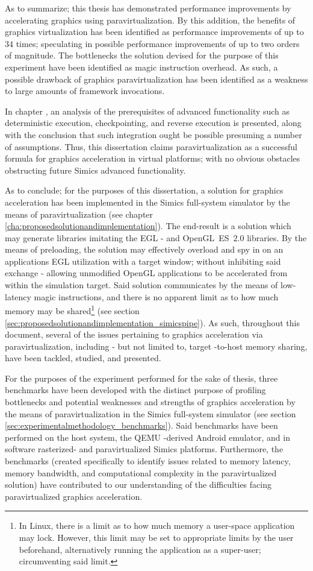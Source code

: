 As to summarize; this thesis has demonstrated performance improvements by accelerating graphics using paravirtualization.
By this addition, the benefits of graphics virtualization has been identified as performance improvements of up to $34$ times; speculating in possible performance improvements of up to two orders of magnitude.
The bottlenecks the solution devised for the purpose of this experiment have been identified as magic instruction overhead.
As such, a possible drawback of graphics paravirtualization has been identified as a weakness to large amounts of framework invocations.

In chapter , an analysis of the prerequisites of advanced functionality such as deterministic execution, checkpointing, and reverse execution is presented, along with the conclusion that such integration ought be possible presuming a number of assumptions.
Thus, this dissertation claims paravirtualization as a successful formula for graphics acceleration in virtual platforms; with no obvious obstacles obstructing future Simics advanced functionality.

As to conclude; for the purposes of this dissertation, a solution for graphics acceleration has been implemented in the Simics full-system simulator by the means of paravirtualization (see chapter \ref{cha:proposedsolutionandimplementation}).
The end-result is a solution which may generate libraries imitating the EGL - and OpenGL~ES~$2.0$ libraries.
By the means of preloading, the solution may effectively overload and spy in on an applications EGL utilization with a target window; without inhibiting said exchange - allowing unmodified OpenGL applications to be accelerated from within the simulation target.
Said solution communicates by the means of low-latency magic instructions, and there is no apparent limit as to how much memory may be shared\footnote{In Linux, there is a limit as to how much memory a user-space application may lock. However, this limit may be set to appropriate limits by the user beforehand, alternatively running the application as a super-user; circumventing said limit.} (see section \ref{sec:proposedsolutionandimplementation_simicspipe}).
As such, throughout this document, several of the issues pertaining to graphics acceleration via paravirtualization, including - but not limited to, target -to-host memory sharing, have been tackled, studied, and presented.

For the purposes of the experiment performed for the sake of thesis, three benchmarks have been developed with the distinct purpose of profiling bottlenecks and potential weaknesses and strengths of graphics acceleration by the means of paravirtualization in the Simics full-system simulator (see section \ref{sec:experimentalmethodology_benchmarks}).
Said benchmarks have been performed on the host system, the QEMU -derived Android emulator, and in software rasterized- and paravirtualized Simics platforms.
Furthermore, the benchmarks (created specifically to identify issues related to memory latency, memory bandwidth, and computational complexity in the paravirtualized solution) have contributed to our understanding of the difficulties facing paravirtualized graphics acceleration.

